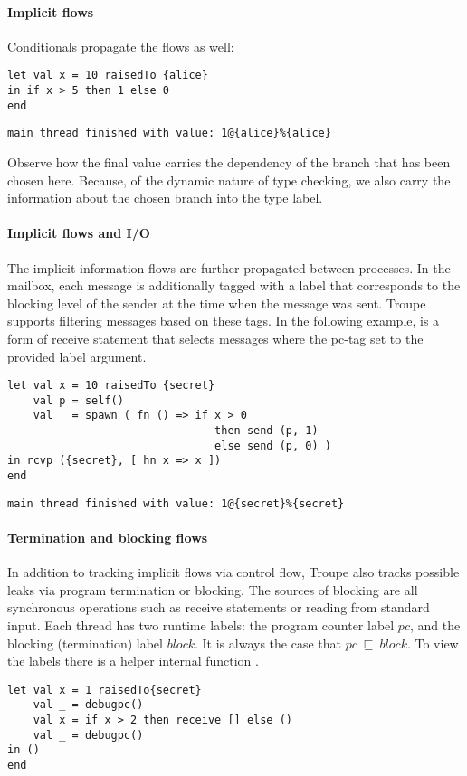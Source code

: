 \paragraph{Implicit flows}
Conditionals propagate the flows as well:


\begin{lstlisting}
let val x = 10 raisedTo {alice} 
in if x > 5 then 1 else 0 
end	
\end{lstlisting}
\begin{verbatim}
main thread finished with value: 1@{alice}%{alice}	
\end{verbatim}
Observe how the final value carries the dependency of the 
branch that has been chosen here. Because, of the dynamic nature of type checking,
we also carry the information about the chosen branch into the type label.

\paragraph{Implicit flows and I/O}
The implicit information flows are further propagated between processes. 
In the mailbox, each message is additionally tagged with a label that 
corresponds to the blocking level of the sender at the time when the message was sent.
Troupe supports filtering messages based on these tags.
In the following example,  is a form of receive statement that selects messages
where the pc-tag set to the provided label argument.

\begin{lstlisting}
let val x = 10 raisedTo {secret}
    val p = self()
    val _ = spawn ( fn () => if x > 0 
    							then send (p, 1) 
    							else send (p, 0) )
in rcvp ({secret}, [ hn x => x ])
end
\end{lstlisting}
\begin{verbatim}
main thread finished with value: 1@{secret}%{secret}
\end{verbatim}


\paragraph{Termination and blocking flows} 
In addition to tracking implicit flows via control flow, Troupe also 
tracks possible leaks via program termination or blocking.
The sources of blocking are all synchronous operations such as receive statements or reading from standard input. 
Each thread has two runtime labels: the program counter label $\mathit{pc}$, and 
the blocking (termination) label $\mathit{block}$. It is always the case that 
$\mathit{pc}~\sqsubseteq~\mathit{block}$. To view the labels there is a 
helper internal function .
\begin{lstlisting}
let val x = 1 raisedTo{secret}
    val _ = debugpc() 
    val x = if x > 2 then receive [] else () 
    val _ = debugpc() 
in () 
end    
\end{lstlisting}

